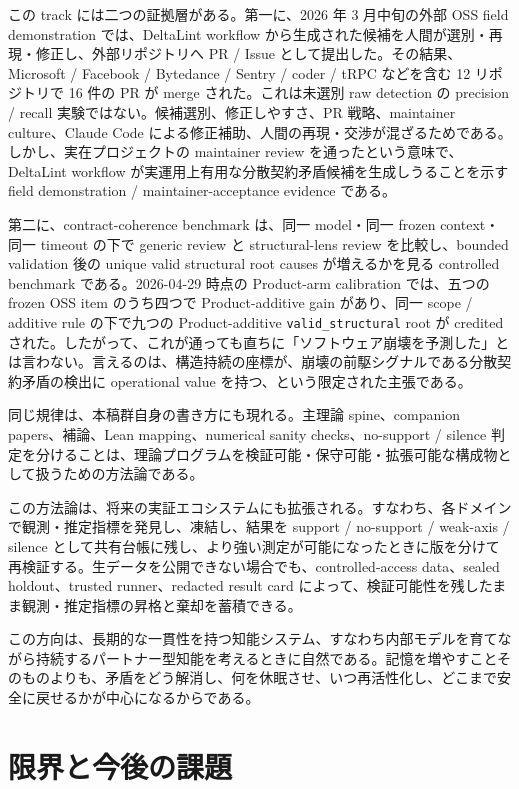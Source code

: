 \documentclass[12pt,a4paper]{article}
\begin{document}
この track には二つの証拠層がある。第一に、2026 年 3 月中旬の外部 OSS field demonstration では、DeltaLint workflow から生成された候補を人間が選別・再現・修正し、外部リポジトリへ PR / Issue として提出した。その結果、Microsoft / Facebook / Bytedance / Sentry / coder / tRPC などを含む 12 リポジトリで 16 件の PR が merge された。これは未選別 raw detection の precision / recall 実験ではない。候補選別、修正しやすさ、PR 戦略、maintainer culture、Claude Code による修正補助、人間の再現・交渉が混ざるためである。しかし、実在プロジェクトの maintainer review を通ったという意味で、DeltaLint workflow が実運用上有用な分散契約矛盾候補を生成しうることを示す field demonstration / maintainer-acceptance evidence である。

第二に、contract-coherence benchmark は、同一 model・同一 frozen context・同一 timeout の下で generic review と structural-lens review を比較し、bounded validation 後の unique valid structural root causes が増えるかを見る controlled benchmark である。2026-04-29 時点の Product-arm calibration では、五つの frozen OSS item のうち四つで Product-additive gain があり、同一 scope / additive rule の下で九つの Product-additive \texttt{valid\_structural} root が credited された。したがって、これが通っても直ちに「ソフトウェア崩壊を予測した」とは言わない。言えるのは、構造持続の座標が、崩壊の前駆シグナルである分散契約矛盾の検出に operational value を持つ、という限定された主張である。

同じ規律は、本稿群自身の書き方にも現れる。主理論 spine、companion papers、補論、Lean mapping、numerical sanity checks、no-support / silence 判定を分けることは、理論プログラムを検証可能・保守可能・拡張可能な構成物として扱うための方法論である。

この方法論は、将来の実証エコシステムにも拡張される。すなわち、各ドメインで観測・推定指標を発見し、凍結し、結果を support / no-support / weak-axis / silence として共有台帳に残し、より強い測定が可能になったときに版を分けて再検証する。生データを公開できない場合でも、controlled-access data、sealed holdout、trusted runner、redacted result card によって、検証可能性を残したまま観測・推定指標の昇格と棄却を蓄積できる。

この方向は、長期的な一貫性を持つ知能システム、すなわち内部モデルを育てながら持続するパートナー型知能を考えるときに自然である。記憶を増やすことそのものよりも、矛盾をどう解消し、何を休眠させ、いつ再活性化し、どこまで安全に戻せるかが中心になるからである。

\section{限界と今後の課題}\label{ux9650ux754cux3068ux4ecaux5f8cux306eux8ab2ux984c}
\end{document}
